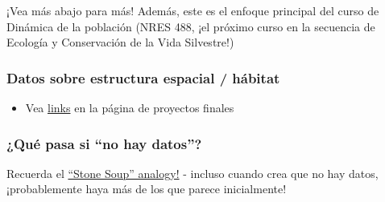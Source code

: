 \documentclass[
]{article}
\providecommand{\tightlist}{%
  \setlength{\itemsep}{0pt}\setlength{\parskip}{0pt}}
\begin{document}
¡Vea más abajo para más! Además, este es el enfoque principal del curso
de Dinámica de la población (NRES 488, ¡el próximo curso en la secuencia
de Ecología y Conservación de la Vida Silvestre!)

\hypertarget{datos-sobre-estructura-espacial-huxe1bitat}{%
\subsubsection{Datos sobre estructura espacial /
hábitat}\label{datos-sobre-estructura-espacial-huxe1bitat}}

\begin{itemize}
\tightlist
\item
  Vea \href{FINAL_PROJECTS.html}{links} en la página de proyectos
  finales
\end{itemize}

\hypertarget{quuxe9-pasa-si-no-hay-datos}{%
\subsubsection{¿Qué pasa si ``no hay
datos''?}\label{quuxe9-pasa-si-no-hay-datos}}

Recuerda el \href{https://en.wikipedia.org/wiki/Stone_Soup}{``Stone
Soup'' analogy!} - incluso cuando crea que no hay datos, ¡probablemente
haya más de los que parece inicialmente!
\end{document}
